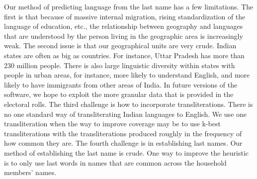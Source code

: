 \documentclass[11pt,  letterpaper]{article}
\begin{document}
Our method of predicting language from the last name has a few limitations. The first is that because of massive internal migration, rising standardization of the language of education, etc., the relationship between geography and languages that are understood by the person living in the geographic area is increasingly weak. The second issue is that our geographical units are very crude. Indian states are often as big as countries. For instance, Uttar Pradesh has more than 230 million people. There is also large linguistic diversity within states with people in urban areas, for instance, more likely to understand English, and more likely to have immigrants from other areas of India. In future versions of the software, we hope to exploit the more granular data that is provided in the electoral rolls. The third challenge is how to incorporate transliterations. There is no one standard way of transliterating Indian languages to English. We use one transliteration when the way to improve coverage may be to use k-best transliterations with the transliterations produced roughly in the frequency of how common they are. The fourth challenge is in establishing last names. Our method of establishing the last name is crude. One way to improve the heuristic is to only use last words in names that are common across the household members’ names.


\newpage


\end{document}
